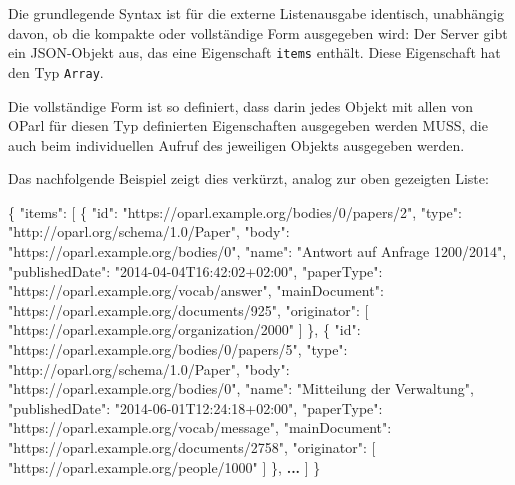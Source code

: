 \documentclass[,a4paper]{article}
\newenvironment{Shaded}{}{}
\newcommand{\DataTypeTok}[1]{\textcolor[rgb]{0.56,0.13,0.00}{{#1}}}
\newcommand{\StringTok}[1]{\textcolor[rgb]{0.25,0.44,0.63}{{#1}}}
\newcommand{\OtherTok}[1]{\textcolor[rgb]{0.00,0.44,0.13}{{#1}}}
\newcommand{\FunctionTok}[1]{\textcolor[rgb]{0.02,0.16,0.49}{{#1}}}
\newcommand{\ErrorTok}[1]{\textcolor[rgb]{1.00,0.00,0.00}{\textbf{{#1}}}}
\begin{document}
Die grundlegende Syntax ist für die externe Listenausgabe identisch,
unabhängig davon, ob die kompakte oder vollständige Form ausgegeben
wird: Der Server gibt ein JSON-Objekt aus, das eine Eigenschaft
\texttt{items} enthält. Diese Eigenschaft hat den Typ \texttt{Array}.

Die vollständige Form ist so definiert, dass darin jedes Objekt mit
allen von OParl für diesen Typ definierten Eigenschaften ausgegeben
werden MUSS, die auch beim individuellen Aufruf des jeweiligen Objekts
ausgegeben werden.

Das nachfolgende Beispiel zeigt dies verkürzt, analog zur oben gezeigten
Liste:

\begin{Shaded}
\begin{Highlighting}[]
\FunctionTok{\{}
    \DataTypeTok{"items"}\FunctionTok{:} \OtherTok{[}
        \FunctionTok{\{}
            \DataTypeTok{"id"}\FunctionTok{:} \StringTok{"https://oparl.example.org/bodies/0/papers/2"}\FunctionTok{,}
            \DataTypeTok{"type"}\FunctionTok{:} \StringTok{"http://oparl.org/schema/1.0/Paper"}\FunctionTok{,}
            \DataTypeTok{"body"}\FunctionTok{:} \StringTok{"https://oparl.example.org/bodies/0"}\FunctionTok{,}
            \DataTypeTok{"name"}\FunctionTok{:} \StringTok{"Antwort auf Anfrage 1200/2014"}\FunctionTok{,}
            \DataTypeTok{"publishedDate"}\FunctionTok{:} \StringTok{"2014-04-04T16:42:02+02:00"}\FunctionTok{,}
            \DataTypeTok{"paperType"}\FunctionTok{:} \StringTok{"https://oparl.example.org/vocab/answer"}\FunctionTok{,}
            \DataTypeTok{"mainDocument"}\FunctionTok{:} \StringTok{"https://oparl.example.org/documents/925"}\FunctionTok{,}
            \DataTypeTok{"originator"}\FunctionTok{:} \OtherTok{[}
                \StringTok{"https://oparl.example.org/organization/2000"}
            \OtherTok{]}
        \FunctionTok{\}}\OtherTok{,}
        \FunctionTok{\{}
            \DataTypeTok{"id"}\FunctionTok{:} \StringTok{"https://oparl.example.org/bodies/0/papers/5"}\FunctionTok{,}
            \DataTypeTok{"type"}\FunctionTok{:} \StringTok{"http://oparl.org/schema/1.0/Paper"}\FunctionTok{,}
            \DataTypeTok{"body"}\FunctionTok{:} \StringTok{"https://oparl.example.org/bodies/0"}\FunctionTok{,}
            \DataTypeTok{"name"}\FunctionTok{:} \StringTok{"Mitteilung der Verwaltung"}\FunctionTok{,}
            \DataTypeTok{"publishedDate"}\FunctionTok{:} \StringTok{"2014-06-01T12:24:18+02:00"}\FunctionTok{,}
            \DataTypeTok{"paperType"}\FunctionTok{:} \StringTok{"https://oparl.example.org/vocab/message"}\FunctionTok{,}
            \DataTypeTok{"mainDocument"}\FunctionTok{:} \StringTok{"https://oparl.example.org/documents/2758"}\FunctionTok{,}
            \DataTypeTok{"originator"}\FunctionTok{:} \OtherTok{[}
                \StringTok{"https://oparl.example.org/people/1000"}
            \OtherTok{]}
        \FunctionTok{\}}\OtherTok{,}
        \ErrorTok{...}
    \OtherTok{]}
\FunctionTok{\}}
\end{Highlighting}
\end{Shaded}
\end{document}
